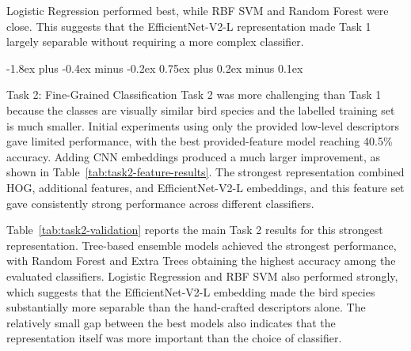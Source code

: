 \documentclass[11pt]{article}
\makeatletter
\renewcommand\subsection{%
    \@startsection{subsection}{2}{\z@}%
                  {-1.8ex plus -0.4ex minus -0.2ex}%
                  {0.75ex plus 0.2ex minus 0.1ex}%
                  {\normalsize\bf\raggedright}}
\makeatother
\begin{document}
Logistic Regression performed best, while RBF SVM and Random Forest were close. 
This suggests that the EfficientNet-V2-L representation made Task 1 largely separable 
without requiring a more complex classifier.


\subsection{Task 2: Fine-Grained Classification}
Task 2 was more challenging than Task 1 because the classes are visually 
similar bird species and the labelled training set is much smaller. 
Initial experiments using only the provided low-level descriptors gave limited
performance, with the best provided-feature model reaching 40.5\% accuracy.
Adding CNN embeddings produced a much larger improvement, as shown in
Table~\ref{tab:task2-feature-results}. The strongest representation combined
HOG, additional features, and EfficientNet-V2-L embeddings, and this feature set
gave consistently strong performance across different classifiers.

\begin{table}[h]
\centering
{}
\caption{Task 2 held-out validation comparison between provided low-level features and the final deep-feature representation.}
\label{tab:task2-feature-results}
\end{table}

Table~\ref{tab:task2-validation} reports the main Task 2 results for this 
strongest representation. Tree-based ensemble models achieved the strongest performance, 
with Random Forest and Extra Trees obtaining the highest accuracy among the evaluated 
classifiers. Logistic Regression and RBF SVM also performed strongly, 
which suggests that the EfficientNet-V2-L embedding made the bird species substantially 
more separable than the hand-crafted descriptors alone. The relatively small gap between 
the best models also indicates that the representation itself was more important than the choice of classifier.
\end{document}
